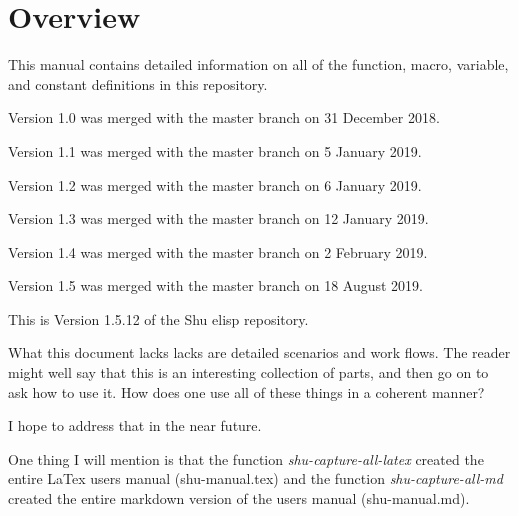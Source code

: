 


\section{Overview}


This manual contains detailed information on all of the function, macro,
variable, and constant definitions in this repository.

Version 1.0 was merged with the master branch on 31 December 2018.

Version 1.1 was merged with the master branch on 5 January 2019.

Version 1.2 was merged with the master branch on 6 January 2019.

Version 1.3 was merged with the master branch on 12 January 2019.

Version 1.4 was merged with the master branch on 2 February 2019.

Version 1.5 was merged with the master branch on 18 August 2019.

This is Version 1.5.12 of the Shu elisp repository.

What this document lacks lacks are detailed scenarios and work flows.  The
reader might well say that this is an interesting collection of parts, and
then go on to ask how to use it.  How does one use all of these things in a
coherent manner?

I hope to address that in the near future.

One thing I will mention is that the function \emph{shu-capture-all-latex} created
the entire LaTex users manual (shu-manual.tex) and the function
\emph{shu-capture-all-md} created the entire markdown version of the users manual
(shu-manual.md).


